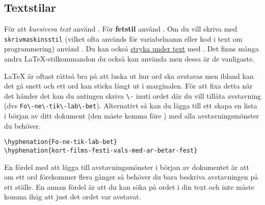 




\subsection{Textstilar}

För att \emph{kursivera text} använd . För \textbf{fetstil}
använd . Om du vill skriva med \texttt{skriv\-maskins\-stil}
(vilket ofta används för variabelnamn eller kod i text om programmering) använd
. Du kan också \underline{stryka under text} med
. Det finns många andra \LaTeX{}-stilkommandon du också
kan använda men dessa är de vanligaste.

\LaTeX{} är oftast rättså bra på att luska ut hur ord ska avstavas men ibland
kan det gå snett och ett ord kan sticka långt ut i marginalen. För att fixa
detta när det händer det kan du antingen skriva \verb|\-| inuti ordet där du
vill tillåta avstavning (dvs \verb|Fo\-ne\-tik\-lab\-bet|). Alternativt så kan
du lägga till ett skapa en lista i början av ditt dokument (den måste komma
före \verb||) med alla avstavningsmönster du behöver.

\begin{verbatim}
\hyphenation{Fo-ne-tik-lab-bet}
\hyphenation{kort-films-festi-vals-med-ar-betar-fest}
\end{verbatim}

En fördel med att lägga till avstavningsmönster i början av dokumentet är att
om ett ord förekommer flera gånger så behöver du bara beskriva avstavningen på
ett ställe. En annan fördel är att du kan söka på ordet i din text och inte
måste komma ihåg att just det ordet var avstavat.

